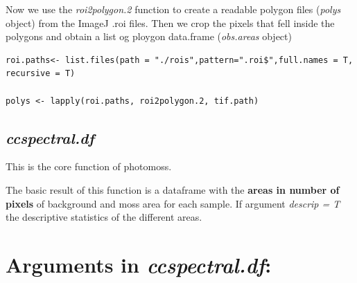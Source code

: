 \documentclass[
]{article}
\begin{document}
Now we use the \emph{roi2polygon.2} function to create a readable
polygon files (\emph{polys} object) from the ImageJ .roi files. Then we
crop the pixels that fell inside the polygons and obtain a list og
ploygon data.frame (\emph{obs.areas} object)

\begin{verbatim}
roi.paths<- list.files(path = "./rois",pattern=".roi$",full.names = T, recursive = T)

polys <- lapply(roi.paths, roi2polygon.2, tif.path)
\end{verbatim}

\hypertarget{ccspectral.df}{%
\subsection{\texorpdfstring{\emph{ccspectral.df}}{ccspectral.df}}\label{ccspectral.df}}

This is the core function of photomoss.

The basic result of this function is a dataframe with the \textbf{areas
in number of pixels} of background and moss area for each sample. If
argument \emph{descrip = T} the descriptive statistics of the different
areas.

\hypertarget{arguments-in-ccspectral.df}{%
\section{\texorpdfstring{Arguments in
\emph{ccspectral.df}:}{Arguments in ccspectral.df:}}\label{arguments-in-ccspectral.df}}
\end{document}
